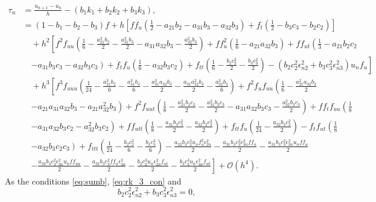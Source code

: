 \documentclass[a4paper, preprint,11pt]{elsarticle}
\numberwithin{equation}{section}
\begin{document}
\begin{align*}
\tau_n &= \frac{u_{n+1}-u_{n}}{h} - (b_1k_1 + b_2k_2 + b_3k_3), \\
&=  (1 - b_1 - b_2 - b_3)f + h\left[ ff_u\left( \frac{1}{2} -a_{21}b_2 -a_{31}b_3 - a_{32}b_3\right) + f_t\left( \frac{1}{2} -b_3c_3- b_2c_2
 \right)\right] \\
& \quad
 + h^2 \left[ f^2f_{uu}\left( \frac{1}{6} - \frac{a_{21}^2b_2}{2} - \frac{a_{31}^2b_3}{2} - a_{31}a_{32}b_3 - \frac{a_{32}^2b_3}{2}\right) + ff_u^2\left(\frac{1}{6} - a_{21}a_{32}b_3\right) + ff_{ut}\left(\frac{1}{3}-a_{21}b_2c_2 \right.\right.\\
 &\quad
 \left. \left.-a_{31}b_3c_3 - a_{32}b_3c_3\right) + f_tf_u\left( \frac{1}{6} - a_{32}b_3c_2\right) +f_{tt}\left( \frac{1}{6}- \frac{b_2c_2^2}{2} - \frac{b_3c_3^2}{2}\right) - \left(b_2c_2^2 \epsilon_{n2}^2 + b_3c_3^2\epsilon_{n3}^2\right)u_nf_u\right]
 \\
 &\quad
 + 
 h^3 \left[ f^3f_{uuu}\left( \frac{1}{24} -\frac{a_{21}^3b_2}{6}-\frac{a_{31}^3b_3}{6} -\frac{a_{31}^2a_{32}b_3}{2} - \frac{a_{31}a_{32}^2b_3}{2} - \frac{a_{32}^3b_3}{6}\right) + f^2f_uf_{uu}\left( \frac{1}{6} - \frac{a_{21}^2a_{32}b_3}{2} \right.\right. \\
 &\quad
 \left. \left. - a_{21}a_{31}a_{32}b_3 - a_{21}a_{32}^2b_3\right) +f^2f_{uut}\left( \frac{1}{8} -\frac{a_{21}^2b_2c_2}{2} -\frac{a_{31}^2b_3c_3}{2} - a_{31}a_{32}b_3c_3 -\frac{a_{32}^2b_3c_3}{2}\right) + ff_tf_{uu}\left( \frac{1}{8} \right. \right.\\
 &\quad
  \left.- a_{31}a_{32}b_3c_2 - a_{32}^2b_3c_2\right) + ff_{utt}\left(\frac{1}{8} - \frac{a_{31}b_3c_3^2}{2} - \frac{a_{32}b_3c_3^2}{2}\right) + f_{tt}f_u \left(\frac{1}{24} - \frac{a_{32}b_3c_2^2}{2} \right)- f_tf_{ut}\left( \frac{1}{8} \right.
 \\
 &\quad\left.\left. - a_{32}b_3c_2c_3\right)+ f_{ttt}\left( \frac{1}{24} -\frac{b_2c_2^3}{6} - \frac{b_3c_3^3}{6}\right) - \frac{a_{32}b_3c_2^2u_nf_u^2\epsilon_{2n}^2}{2} - \frac{a_{31}b_3c_3^2\epsilon_{3n}^2ff_u}{2} -\frac{a_{31}b_3c_3^2\epsilon_{3n}^2u_nff_u}{2}\right. \\
 & \quad \left.-\frac{a_{32}b_3c_3^2\epsilon_{3n}^2u_nff_{uu}}{2}  - \frac{a_{32}b_3 c_3^2ff_{u}\epsilon_{3n}^2}{2}-\frac{b_2c_2^3u_n\epsilon_{2n}^2f_{ut}}{2} -\frac{b_3c_3^3u_n\epsilon_{3n}^2f_{ut}}{2}
 \right]+\mathcal{O}(h^4).
\end{align*}
As the conditions  \eqref{eq:sumb}, \eqref{eq:rk_3_con} and 
\begin{equation*}
    b_2c_2^2\epsilon_{n2}^2 + b_3c_3^2\epsilon_{n3}^2 = 0,
 \end{equation*}
\end{document}
